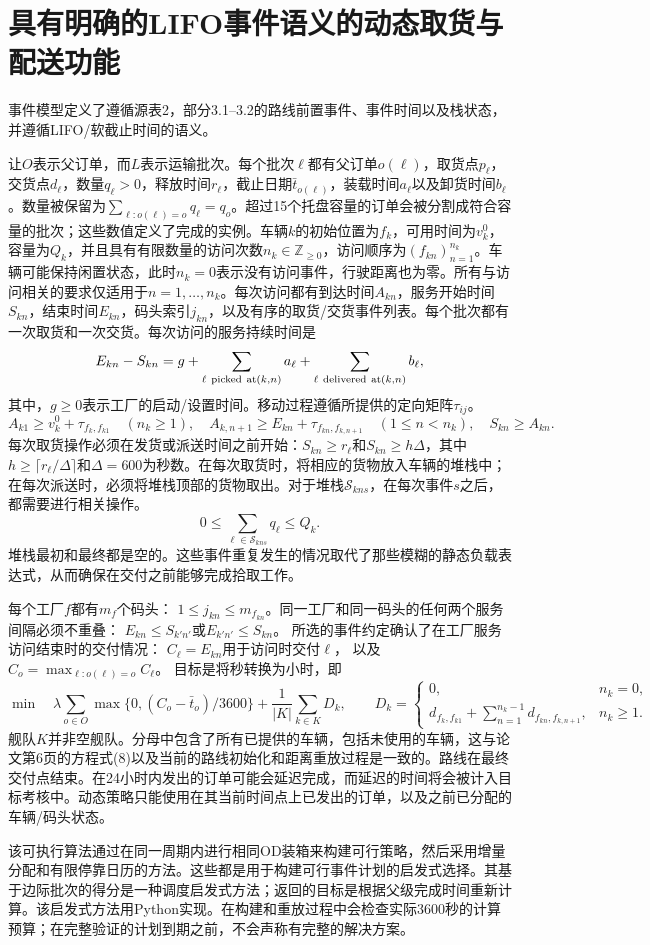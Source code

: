 \documentclass{article}
\begin{document}
\section*{具有明确的LIFO事件语义的动态取货与配送功能}
事件模型定义了遵循源表2，部分3.1--3.2的路线前置事件、事件时间以及栈状态，并遵循LIFO/软截止时间的语义。


让$O$表示父订单，而$L$表示运输批次。每个批次$\ell$都有父订单$o(\ell)$，取货点$p_\ell$，交货点$d_\ell$，数量$q_\ell>0$，释放时间$r_\ell$，截止日期$\bar t_{o(\ell)}$，装载时间$a_\ell$以及卸货时间$b_\ell$。数量被保留为$\sum_{\ell:o(\ell)=o}q_\ell=q_o$。超过15个托盘容量的订单会被分割成符合容量的批次；这些数值定义了完成的实例。车辆$k$的初始位置为$f_k$，可用时间为$v_k^0$，容量为$Q_k$，并且具有有限数量的访问次数$n_k\in\mathbb Z_{\ge0}$，访问顺序为$(f_{kn})_{n=1}^{n_k}$。车辆可能保持闲置状态，此时$n_k=0$表示没有访问事件，行驶距离也为零。所有与访问相关的要求仅适用于$n=1,\ldots,n_k$。每次访问都有到达时间$A_{kn}$，服务开始时间$S_{kn}$，结束时间$E_{kn}$，码头索引$j_{kn}$，以及有序的取货/交货事件列表。每个批次都有一次取货和一次交货。每次访问的服务持续时间是
\[
E_{kn}-S_{kn}=g+\sum_{\ell\ {\rm picked\ at}(k,n)}a_\ell
                  +\sum_{\ell\ {\rm delivered\ at}(k,n)}b_\ell,
\]
其中，$g\ge0$表示工厂的启动/设置时间。移动过程遵循所提供的定向矩阵$\tau_{ij}$。
\[
A_{k1}\ge v_k^0+\tau_{f_k,f_{k1}}\quad(n_k\ge1),\quad
A_{k,n+1}\ge E_{kn}+\tau_{f_{kn},f_{k,n+1}}\quad(1\le n<n_k),\quad S_{kn}\ge A_{kn}.
\]
每次取货操作必须在发货或派送时间之前开始：$S_{kn}\ge r_\ell$和$S_{kn}\ge h\Delta$，其中$h\ge\lceil r_\ell/\Delta\rceil$和$\Delta=600$为秒数。在每次取货时，将相应的货物放入车辆的堆栈中；在每次派送时，必须将堆栈顶部的货物取出。对于堆栈$\mathcal S_{kns}$，在每次事件$s$之后，都需要进行相关操作。
\[
0\le\sum_{\ell\in\mathcal S_{kns}}q_\ell\le Q_k.
\]
堆栈最初和最终都是空的。这些事件重复发生的情况取代了那些模糊的静态负载表达式，从而确保在交付之前能够完成拾取工作。

每个工厂$f$都有$m_f$个码头：
$1\le j_{kn}\le m_{f_{kn}}$。同一工厂和同一码头的任何两个服务间隔必须不重叠：
$E_{kn}\le S_{k'n'}$或$E_{k'n'}\le S_{kn}$。
所选的事件约定确认了在工厂服务访问结束时的交付情况：
$C_\ell=E_{kn}$用于访问时交付$\ell$，
以及$C_o=\max_{\ell:o(\ell)=o}C_\ell$。
目标是将秒转换为小时，即
\[
\min\quad\lambda\sum_{o\in O}\max\{0,(C_o-\bar t_o)/3600\}
+\frac1{|K|}\sum_{k\in K}D_k,\qquad
D_k=\begin{cases}0,&n_k=0,\\ d_{f_k,f_{k1}}+\sum_{n=1}^{n_k-1}d_{f_{kn},f_{k,n+1}},&n_k\ge1.\end{cases}
\]
舰队$K$并非空舰队。分母中包含了所有已提供的车辆，包括未使用的车辆，这与论文第6页的方程式(8)以及当前的路线初始化和距离重放过程是一致的。路线在最终交付点结束。在24小时内发出的订单可能会延迟完成，而延迟的时间将会被计入目标考核中。动态策略只能使用在其当前时间点上已发出的订单，以及之前已分配的车辆/码头状态。

该可执行算法通过在同一周期内进行相同OD装箱来构建可行策略，然后采用增量分配和有限停靠日历的方法。这些都是用于构建可行事件计划的启发式选择。其基于边际批次的得分是一种调度启发式方法；返回的目标是根据父级完成时间重新计算。该启发式方法用Python实现。在构建和重放过程中会检查实际3600秒的计算预算；在完整验证的计划到期之前，不会声称有完整的解决方案。
\end{document}
